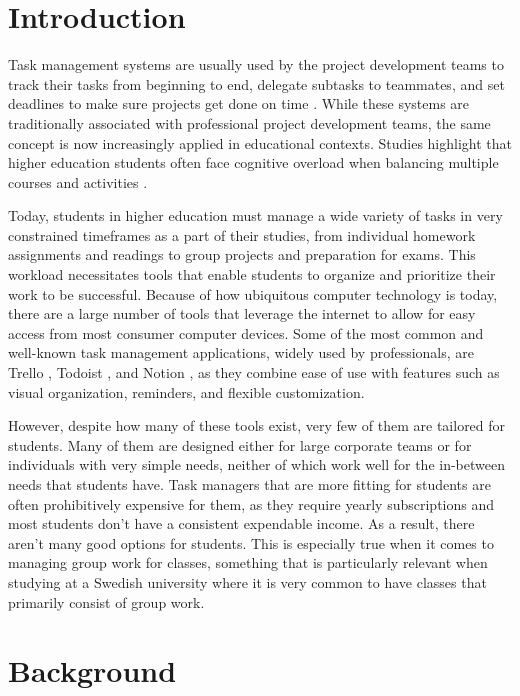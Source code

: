 \documentclass[11pt,oneside]{article}
\begin{document}
\clearpage

\tableofcontents

\section{Introduction}

Task management systems are usually used by the project development teams to track their tasks from beginning to end, delegate subtasks to teammates, and set deadlines to make sure projects get done on time \citep{nurzi2022web}. While these systems are traditionally associated with professional project development teams, the same concept is now increasingly applied in educational contexts. Studies highlight that higher education students often face cognitive overload when balancing multiple courses and activities \citep{kirschner2013learners}. 

Today, students in higher education must manage a wide variety of tasks in very constrained timeframes as a part of their studies, from individual homework assignments and readings to group projects and preparation for exams. This workload necessitates tools that enable students to organize and prioritize their work to be successful. Because of how ubiquitous computer technology is today, there are a large number of tools that leverage the internet to allow for easy access from most consumer computer devices. Some of the most common and well-known task management applications, widely used by professionals, are Trello \citep{shchetynina2022trello}, Todoist \citep{bourbon2021time}, and Notion \citep{reach2022notion}, as they combine ease of use with features such as visual organization, reminders, and flexible customization.

However, despite how many of these tools exist, very few of them are tailored for students. Many of them are designed either for large corporate teams or for individuals with very simple needs, neither of which work well for the in-between needs that students have. Task managers that are more fitting for students are often prohibitively expensive for them, as they require yearly subscriptions and most students don’t have a consistent expendable income. As a result, there aren’t many good options for students. This is especially true when it comes to managing group work for classes, something that is particularly relevant when studying at a Swedish university where it is very common to have classes that primarily consist of group work.

\section{Background}
\label{cha:background}
\end{document}
